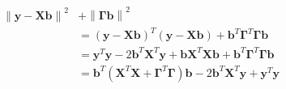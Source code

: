 \documentclass[10pt]{article}
\begin{document}
\begin{align*}\begin{split}
\left\lVert \boldsymbol y - \boldsymbol{X} \boldsymbol{b} \right \rVert^2 &+ \left\lVert \boldsymbol{\Gamma} \boldsymbol{b} \right \rVert^2 \\
&= \left( \boldsymbol y - \boldsymbol{X} \boldsymbol{b} \right)^T
\left( \boldsymbol y - \boldsymbol{X} \boldsymbol{b} \right) +
\boldsymbol b^T \boldsymbol \Gamma^T \boldsymbol \Gamma \boldsymbol b \\
&= \boldsymbol y^T \boldsymbol y -
   2 \boldsymbol b^T \boldsymbol X^T \boldsymbol y +
   \boldsymbol b \boldsymbol X^T \boldsymbol X \boldsymbol b +
\boldsymbol b^T \boldsymbol \Gamma^T \boldsymbol \Gamma \boldsymbol b \\
&= \boldsymbol b^T \left( \boldsymbol X^T \boldsymbol X + \boldsymbol \Gamma^T \boldsymbol \Gamma \right) \boldsymbol b -
2 \boldsymbol b^T \boldsymbol X^T \boldsymbol y +
\boldsymbol y^T \boldsymbol y \\
\end{split}\end{align*}
\end{document}
